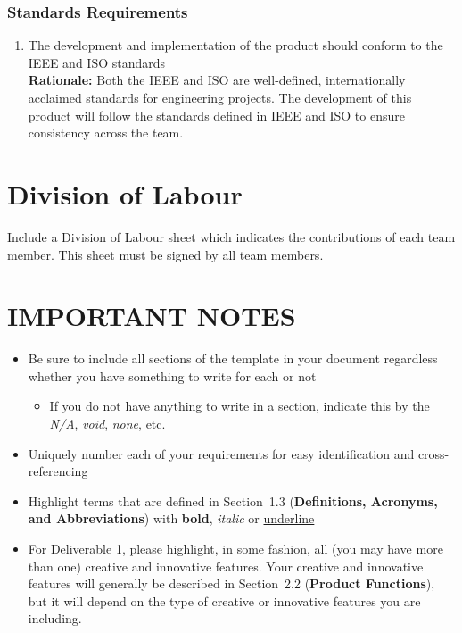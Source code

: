 \documentclass[]{article}
\begin{document}
\subsubsection{Standards Requirements}
\label{ssub:standards_requirements}
\begin{enumerate}[{LR-STD}1. ]
	\item The development and implementation of the product should conform to the IEEE and ISO standards \\
	{\bf Rationale:} Both the IEEE and ISO are well-defined, internationally acclaimed standards for engineering projects. The development of this product will follow the standards defined in IEEE and ISO to ensure consistency across the team.
\end{enumerate}



\appendix
\section{Division of Labour}
\label{sec:division_of_labour}
Include a Division of Labour sheet which indicates the contributions of each team member. This sheet must be signed by all team members.

\newpage
\section*{IMPORTANT NOTES}
\begin{itemize}
	\item Be sure to include all sections of the template in your document regardless whether you have something to write for each or not
	\begin{itemize}
		\item If you do not have anything to write in a section, indicate this by the \emph{N/A}, \emph{void}, \emph{none}, etc.
	\end{itemize}
	\item Uniquely number each of your requirements for easy identification and cross-referencing
	\item Highlight terms that are defined in Section~1.3 (\textbf{Definitions, Acronyms, and Abbreviations}) with \textbf{bold}, \emph{italic} or \underline{underline}
	\item For Deliverable 1, please highlight, in some fashion, all (you may have more than one) creative and innovative features. Your creative and innovative features will generally be described in Section~2.2 (\textbf{Product Functions}), but it will depend on the type of creative or innovative features you are including.
\end{itemize}
\end{document}
